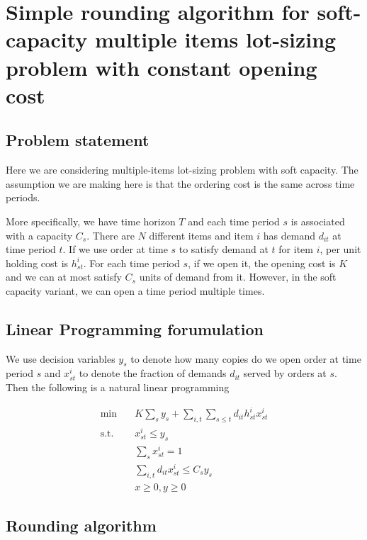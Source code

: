 \section{Simple rounding algorithm for soft-capacity multiple items lot-sizing
problem with constant opening cost}

\subsection{Problem statement}

Here we are considering multiple-items lot-sizing problem with
soft capacity. The assumption we are making here is that
the ordering cost is the same across time periods.

More specifically, we have time horizon $T$ and each time period
$s$ is associated with a capacity $C_s$. There are $N$ different
items and item $i$ has demand $d_{it}$ at time period $t$. If we
use order at time $s$ to satisfy demand at $t$ for item $i$,
per unit holding cost is $h_{st}^i$. For each time period $s$,
if we open it, the opening cost is $K$ and we can at most satisfy
$C_s$ units of demand from it. However, in the soft capacity
variant, we can open a time period multiple times.


\subsection{Linear Programming forumulation}

We use decision variables $y_s$ to denote how many copies do we
open order at time period $s$ and $x_{st}^i$ to denote the fraction of
demands $d_{it}$ served by orders at $s$. Then the following is
a natural linear programming

\begin{align*}
\min \quad    & K\sum_s y_s + \sum_{i,t}\sum_{s\le t}
                d_{it}h_{st}^i x_{st}^i   \\
\text{s.t.} \quad  & x_{st}^i \le y_s          \\
              & \sum_s x_{st}^i = 1       \\
              & \sum_{i,t} d_{it}x_{st}^i \le C_s y_s \\
              & x \ge 0, y \ge 0
\end{align*}


\subsection{Rounding algorithm}

